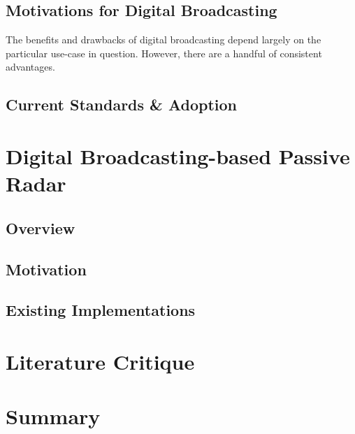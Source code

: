 \documentclass[class=report,11pt,crop=false]{standalone}
\begin{document}
\subsection{Motivations for Digital Broadcasting}
The benefits and drawbacks of digital broadcasting depend largely on the particular use-case in question. However, there are a handful of consistent advantages.

\subsection{Current Standards \& Adoption}

\section{Digital Broadcasting-based Passive Radar}
\subsection{Overview}
\subsection{Motivation}
\subsection{Existing Implementations}

\section{Literature Critique}

\section{Summary}

\ifstandalone

\printnoidxglossary[type=\acronymtype,nonumberlist]
\fi
\end{document}
